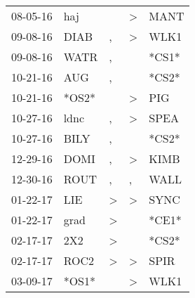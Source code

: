 \begin{supertabular}{p{0.07\textwidth}p{0.06\textwidth}p{0.02\textwidth}p{0.02\textwidth}p{0.06\textwidth}}
          08-05-16\textsuperscript{} &            haj\textsuperscript{} &                  &     \textgreater &           MANT\textsuperscript{} \\
          09-08-16\textsuperscript{} &           DIAB\textsuperscript{} &                , &     \textgreater &           WLK1\textsuperscript{} \\
          09-08-16\textsuperscript{} &           WATR\textsuperscript{} &                , &                  &                            *CS1* \\
          10-21-16\textsuperscript{} &            AUG\textsuperscript{} &                , &                  &                            *CS2* \\
          10-21-16\textsuperscript{} &                            *OS2* &                  &     \textgreater &            PIG\textsuperscript{} \\
          10-27-16\textsuperscript{} &           ldnc\textsuperscript{} &                , &     \textgreater &           SPEA\textsuperscript{} \\
          10-27-16\textsuperscript{} &           BILY\textsuperscript{} &                , &                  &                            *CS2* \\
          12-29-16\textsuperscript{} &           DOMI\textsuperscript{} &                , &     \textgreater &           KIMB\textsuperscript{} \\
          12-30-16\textsuperscript{} &           ROUT\textsuperscript{} &                , &                , &           WALL\textsuperscript{} \\
          01-22-17\textsuperscript{} &            LIE\textsuperscript{} &     \textgreater &     \textgreater &           SYNC\textsuperscript{} \\
          01-22-17\textsuperscript{} &           grad\textsuperscript{} &     \textgreater &                  &                            *CE1* \\
          02-17-17\textsuperscript{} &            2X2\textsuperscript{} &     \textgreater &                  &                            *CS2* \\
          02-17-17\textsuperscript{} &           ROC2\textsuperscript{} &     \textgreater &     \textgreater &           SPIR\textsuperscript{} \\
          03-09-17\textsuperscript{} &                            *OS1* &                  &     \textgreater &           WLK1\textsuperscript{} \\

\end{supertabular}
